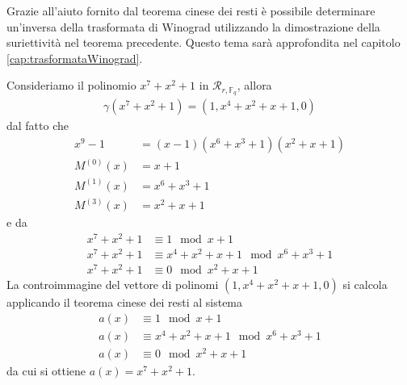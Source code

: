 \begin{osservazione}
   Grazie all'aiuto fornito dal teorema cinese dei resti è possibile determinare un'inversa della trasformata di Winograd utilizzando la dimostrazione della suriettività nel teorema precedente. Questo tema sarà approfondita nel capitolo \ref{cap:trasformataWinograd}.
\end{osservazione}
\begin{esempio}
   Consideriamo il polinomio $x^7+x^2+1$ in $\mathcal{R}_{r, \mathbb{F}_q }$, allora
   \begin{align*}
      \gamma(x^7+x^2+1) = (1, x^4 + x^2 + x + 1, 0)
   \end{align*}
   dal fatto che
   \begin{align*}
      x^9 - 1 &= (x-1)(x^6 + x^3 + 1)(x^2 + x + 1) \\
       M^{(0)}(x) &= x+1  \\
       M^{(1)}(x) &= x^6 + x^3 + 1 \\
       M^{(3)}(x) &= x^2 + x + 1
   \end{align*}
   e da
   \begin{align*}
    x^7+x^2+1 &\equiv 1 \mod{x+1}  \\
    x^7+x^2+1 &\equiv x^4 + x^2 + x + 1 \mod{x^6 + x^3 + 1} \\
    x^7+x^2+1 &\equiv 0 \mod{x^2 + x + 1}
   \end{align*}
   La controimmagine del vettore di polinomi $(1, x^4 + x^2 + x + 1, 0)$ si calcola applicando il teorema cinese dei resti al sistema
   \begin{align*}
      a(x) &\equiv 1 \mod{x+1} \\
      a(x) &\equiv x^4 + x^2 + x + 1 \mod{x^6 + x^3 + 1} \\
      a(x) &\equiv 0 \mod{x^2 + x + 1}
   \end{align*}
   da cui si ottiene $a(x) = x^7+x^2+1 $.
\end{esempio}

